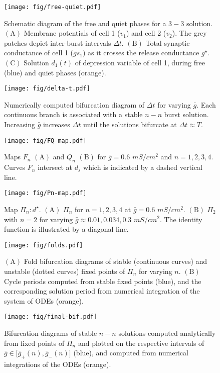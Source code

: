 \documentclass[utf8,draft]{frontiersFPHY} %
\newcommand{\gbar}{\bar g}
\newcommand{\delt}{\Delta t}
\begin{document}
\begin{figure}[h!]
  \centering
  \texttt{[image: fig/free-quiet.pdf]}
  \caption{Schematic diagram of the free and quiet phases for a $3-3$ solution. $\bm{\mathrm{(A)}}$ Membrane potentials of cell 1 ($v_{1}$) and cell 2 ($v_{2}$).  The grey patches depict inter-burst-intervals $\delt$. $\bm{\mathrm{(B)}}$ Total synaptic conductance of cell 1 ($\gbar s_1$) as it crosses the release conductance $g^{\star}$. $\bm{\mathrm{(C)}}$ Solution $d_1(t)$ of depression variable of cell 1, during free (blue) and quiet phases (orange).~\label{fig:free-quiet1}}
\end{figure}

\begin{figure}[h!]
  \centering
  \texttt{[image: fig/delta-t.pdf]}
  \caption{Numerically computed bifurcation diagram of $\delt$ for varying $\gbar$. Each continuous branch is associated with a stable $n-n$ burst solution. Increasing $\gbar$ increases $\Delta t$ until the solutions bifurcate at $\Delta t\approx T$.~\label{fig:delta-t}}
\end{figure}

\begin{figure}[h!]
  \centering
  \texttt{[image: fig/FQ-map.pdf]}
  \caption{Maps $F_n$ $\bm{\mathrm{(A)}}$ and $Q_n$ $\bm{\mathrm{(B)}}$ for $\gbar=0.6$ $\si{mS/cm^{2}}$ and $n=1,2,3,4$. Curves $F_n$ intersect at $d_{s}$ which is indicated by a dashed vertical line.~\label{fig:FQ-map}}
\end{figure}

\begin{figure}[h!]
  \centering
  \texttt{[image: fig/Pn-map.pdf]}
  \caption{Map $\Pi_{n}:d^{\star}$. $\bm{\mathrm{(A)}}$ $\Pi_{n}$ for $n=1,2,3,4$ at $\gbar=0.6$ $\si{mS/cm^{2}}$. $\bm{\mathrm{(B)}}$ $\Pi_{2}$ with $n=2$ for varying $\gbar \approx 0.01, 0.034, 0.3$ $\si{mS/cm^{2}}$. The identity function is illustrated by a diagonal line.~\label{fig:Pn-map}}
\end{figure}

\begin{figure}[h!]
  \centering
  \texttt{[image: fig/folds.pdf]}
  \caption{$\bm{\mathrm{(A)}}$ Fold bifurcation diagrams of stable (continuous curves) and unstable (dotted curves) fixed points of $\Pi_{n}$ for varying $n$. $\bm{\mathrm{(B)}}$ Cycle periods computed from stable fixed points (blue), and the corresponding solution period from numerical integration of the system of ODEs (orange).~\label{fig:folds}}
\end{figure}

\begin{figure}[h!]
  \centering
  \texttt{[image: fig/final-bif.pdf]}
  \caption{Bifurcation diagrams of stable $n-n$ solutions computed analytically from fixed points of $\Pi_n$ and plotted on the respective intervals of $\gbar\in \big[\gbar_+(n),\gbar_-(n)\big]$ (blue), and computed from numerical integrations of the ODEs (orange).~\label{fig:final-bif}}
\end{figure}
\end{document}
